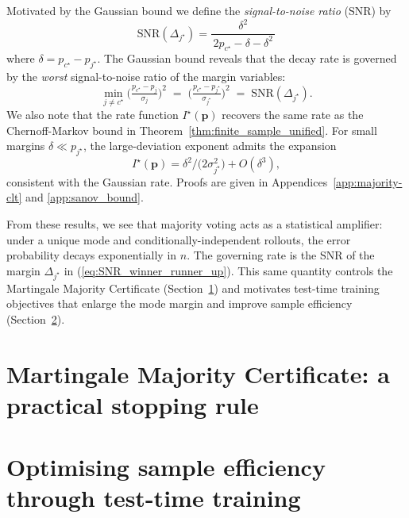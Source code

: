 \documentclass{article} %
\begin{document}
Motivated by the Gaussian bound we define the \emph{signal-to-noise ratio} (SNR) by
\begin{equation*}
\mbox{SNR}(\Delta_{j^\star}) = \frac{\delta^2}{\,2p_{c^\star}-\delta-\delta^2\,}
\end{equation*}
where $\delta = p_{c^\star} - p_{j^\star}$.  
\noindent
The Gaussian bound reveals that the decay rate is governed by the \emph{worst} signal-to-noise ratio of the margin variables:
\begin{equation}\label{eq:SNR_winner_runner_up}
\min_{j\neq c^\star}\Big(\tfrac{p_{c^\star}-p_j}{\sigma_j}\Big)^2
\;=\;
\Big(\tfrac{p_{c^\star}-p_{j^\star}}{\sigma_{j^\star}}\Big)^2
\;=\;
\mathrm{SNR}(\Delta_{j^\star}).
\end{equation}
We also note that the rate function $I^\star(\mathbf{p})$ recovers the same rate as the Chernoff-Markov bound in Theorem~\ref{thm:finite_sample_unified}.  For small margins $\delta\ll p_{j^\star}$, the large-deviation exponent admits the expansion
$$I^\star(\mathbf p)=\delta^2/\big(2\sigma_{j^\star}^2\big)+O(\delta^3),$$
consistent with the Gaussian rate. Proofs are given in Appendices~\ref{app:majority-clt} and \ref{app:sanov_bound}.

\medskip

From these results, we see that majority voting acts as a statistical amplifier: under a unique mode and conditionally-independent rollouts,
the error probability decays {exponentially} in $n$.
The governing rate is the SNR of the margin $\Delta_{j^\star}$ in (\ref{eq:SNR_winner_runner_up}).
This same quantity controls the Martingale Majority Certificate (Section~\ref{sec:stopping_rule}) and motivates
test-time training objectives that enlarge the mode margin and improve sample efficiency (Section~\ref{sec:test_time_training_loss}).


\section{Martingale Majority Certificate: a practical stopping rule}\label{sec:stopping_rule} 


\section{Optimising sample efficiency through test-time training}
\label{sec:test_time_training_loss}


\end{document}
